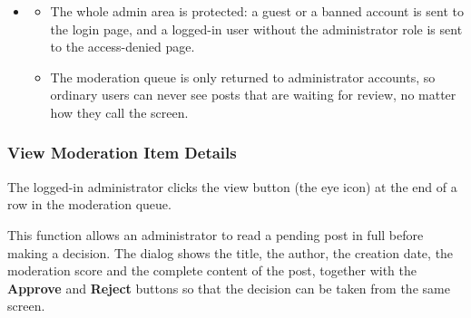 \begin{itemize}[leftmargin=1.6em,topsep=4pt,itemsep=3pt,parsep=0pt,label=$\bullet$]
\begin{itemize}[leftmargin=2.2em,topsep=2pt,itemsep=3pt,parsep=0pt,label=$\circ$]
            \item \textbf{Not Allowed}: When a user who is not an administrator opens the screen, the user is sent to the access-denied page, because only administrators may read the moderation queue.
            \item \textbf{Lost Connection}: When the queue cannot be loaded, the screen shows an empty list so that the administrator can reload the page and try again.
        \end{itemize}
    \item {}
        \begin{itemize}[leftmargin=2.2em,topsep=2pt,itemsep=3pt,parsep=0pt,label=$\circ$]
            \item The whole admin area is protected: a guest or a banned account is sent to the login page, and a logged-in user without the administrator role is sent to the access-denied page.
            \item The moderation queue is only returned to administrator accounts, so ordinary users can never see posts that are waiting for review, no matter how they call the screen.
        \end{itemize}
\end{itemize}


\subsubsection{View Moderation Item Details}

 The logged-in administrator clicks the view button (the eye icon) at the end of a row in the moderation queue.

 This function allows an administrator to read a pending post in full before making a decision. The dialog shows the title, the author, the creation date, the moderation score and the complete content of the post, together with the \textbf{Approve} and \textbf{Reject} buttons so that the decision can be taken from the same screen.



